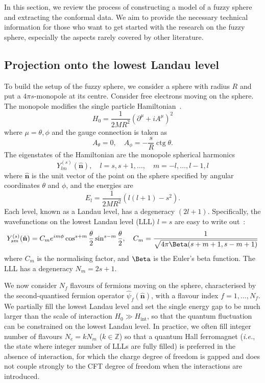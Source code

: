 \documentclass{timesjhep}
\begin{document}
In this section, we review the process of constructing a model of a fuzzy sphere and extracting the conformal data. We aim to provide the necessary technical information for those who want to get started with the research on the fuzzy sphere, especially the aspects rarely covered by other literature. 

\subsection{Projection onto the lowest Landau level}
\label{sec:setup}

To build the setup of the fuzzy sphere, we consider a sphere with radius $R$ and put a $4\pi s$-monopole at its centre. Consider free electrons moving on the sphere. The monopole modifies the single particle Hamiltonian~\cite{Haldane1983LLL,Wu1976LLL,Greiter2011LLL,Hasebe2010LLL}. 
\begin{equation}
    H_0=\frac{1}{2MR^2}(\partial^\mu+iA^\mu)^2
\end{equation} where $\mu=\theta,\phi$ and the gauge connection is taken as
\begin{equation}
    A_\theta=0,\quad A_\phi=-\frac{s}{R}\operatorname{ctg}\theta.
\end{equation}
The eigenstates of the Hamiltonian are the monopole spherical harmonics 
\begin{equation}
    Y_{lm}^{(s)}(\hat{\mathbf{n}}),\quad l=s,s+1,\dots,\quad m=-l,\dots,l-1,l
\end{equation}
where $\hat{\mathbf{n}}$ is the unit vector of the point on the sphere specified by angular coordinates $\theta$ and $\phi$, and the energies are
\begin{equation}
    E_l=\frac{1}{2MR^2}(l(l+1)-s^2).
\end{equation}
Each level, known as a Landau level, has a degeneracy $(2l+1)$. Specifically, the wavefunctions on the lowest Landau level (LLL) $l=s$ are easy to write out~: 
\begin{equation}
    Y_{sm}^{(s)}(\hat{\mathbf{n}})=C_me^{im\phi}\cos^{s+m}\frac{\theta}{2}\sin^{s-m}\frac{\theta}{2},\quad C_m=\frac{1}{{\sqrt{4\pi\Beta(s+m+1,s-m+1)}}}
\end{equation}
where $C_m$ is the normalising factor, and $\Beta$ is the Euler's beta function. The LLL has a degeneracy $N_m=2s+1$. 

We now consider $N_f$ flavours of fermions moving on the sphere, characterised by the second-quantised fermion operator $\hat{\psi}_f(\hat{\mathbf{n}})$, with a flavour index $f=1,\dots,N_f$. We partially fill the lowest Landau level and set the single energy gap to be much larger than the scale of interaction $H_0\gg H_\mathrm{int}$, so that the quantum fluctuation can be constrained on the lowest Landau level. In practice, we often fill integer number of flavours $N_e=kN_m$ ($k\in\mathbb{Z}$) so that a quantum Hall ferromagnet (\textit{i.e.}, the state where integer number of LLLs are fully filled) is preferred in the absence of interaction, for which the charge degree of freedom is gapped and does not couple strongly to the CFT degree of freedom when the interactions are introduced. 
\end{document}
